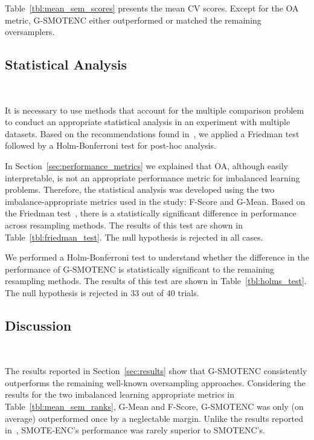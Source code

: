 \documentclass[preprint,12pt]{elsarticle}
\begin{document}
{

Table~\ref{tbl:mean_sem_scores} presents the mean CV scores.
Except for the OA metric, G-SMOTENC either outperformed or matched the
remaining oversamplers.



\subsection{Statistical Analysis}~\label{sec:statistical_analysis}

It is necessary to use methods that account for the multiple comparison
problem to conduct an appropriate statistical analysis in an experiment with
multiple datasets. Based on the recommendations found in~\cite{Demsar2006}, we
applied a Friedman test followed by a Holm-Bonferroni test for post-hoc
analysis.

In Section~\ref{sec:performance_metrics} we explained that OA, although easily
interpretable, is not an appropriate performance metric for imbalanced
learning problems. Therefore, the statistical analysis was developed using the
two imbalance-appropriate metrics used in the study: F-Score and G-Mean. Based
on the Friedman test~\cite{friedman1937use}, there is a statistically
significant difference in performance across resampling methods. The results
of this test are shown in Table~\ref{tbl:friedman_test}. The null hypothesis
is rejected in all cases.



We performed a Holm-Bonferroni test to understand whether the difference in
the performance of G-SMOTENC is statistically significant to the remaining
resampling methods. The results of this test are shown in
Table~\ref{tbl:holms_test}. The null hypothesis is rejected in 33 out of 40
trials.



\subsection{Discussion}~\label{sec:discussion}

The results reported in Section~\ref{sec:results} show that G-SMOTENC
consistently outperforms the remaining well-known oversampling approaches.
Considering the results for the two imbalanced learning appropriate metrics in
Table~\ref{tbl:mean_sem_ranks}, G-Mean and F-Score, G-SMOTENC was only (on
average) outperformed once by a neglectable margin. Unlike the results
reported in~\cite{mukherjee2021smote}, SMOTE-ENC's performance was rarely
superior to SMOTENC's.

}
\end{document}
